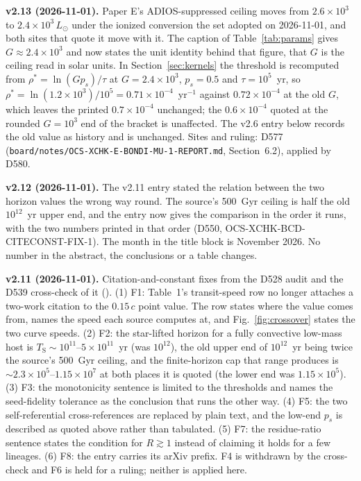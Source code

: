 \documentclass[11pt]{article}
\begin{document}
\textbf{v2.13 (2026-11-01).} Paper E's ADIOS-suppressed ceiling moves from $2.6\times10^{3}$ to $2.4\times10^{3}\,L_\odot$ under the ionized conversion the set adopted on 2026-11-01, and both sites that quote it move with it. The caption of Table~\ref{tab:params} gives $G \approx 2.4\times10^{3}$ and now states the unit identity behind that figure, that $G$ is the ceiling read in solar units. In Section~\ref{sec:kernels} the threshold is recomputed from $\rho^{*} = \ln(G p_{s})/\tau$ at $G = 2.4\times10^{3}$, $p_{s} = 0.5$ and $\tau = 10^{5}$~yr, so $\rho^{*} = \ln(1.2\times10^{3})/10^{5} = 0.71\times10^{-4}$~yr$^{-1}$ against $0.72\times10^{-4}$ at the old $G$, which leaves the printed $0.7\times10^{-4}$ unchanged; the $0.6\times10^{-4}$ quoted at the rounded $G = 10^{3}$ end of the bracket is unaffected. The v2.6 entry below records the old value as history and is unchanged. Sites and ruling: D577 (\texttt{board/notes/OCS-XCHK-E-BONDI-MU-1-REPORT.md}, Section~6.2), applied by D580.

\textbf{v2.12 (2026-11-01).} The v2.11 entry stated the relation between the two horizon values the wrong way round. The source's 500~Gyr ceiling is half the old $10^{12}$~yr upper end, and the entry now gives the comparison in the order it runs, with the two numbers printed in that order (D550, OCS-XCHK-BCD-CITECONST-FIX-1). The month in the title block is November 2026. No number in the abstract, the conclusions or a table changes.

\textbf{v2.11 (2026-11-01).} Citation-and-constant fixes from the D528 audit and the D539 cross-check of it (). (1) F1: Table~1's transit-speed row no longer attaches a two-work citation to the $0.15\,c$ point value. The row states where the value comes from, names the speed each source computes at, and Fig.~\ref{fig:crossover} states the two curve speeds. (2) F2: the star-lifted horizon for a fully convective low-mass host is $T_{\mathrm S} \sim 10^{11}$--$5\times10^{11}$~yr (was $10^{12}$), the old upper end of $10^{12}$~yr being twice the source's 500~Gyr ceiling, and the finite-horizon cap that range produces is $\sim2.3\times10^{5}$--$1.15\times10^{7}$ at both places it is quoted (the lower end was $1.15\times10^{5}$). (3) F3: the monotonicity sentence is limited to the thresholds and names the seed-fidelity tolerance as the conclusion that runs the other way. (4) F5: the two self-referential cross-references are replaced by plain text, and the low-end $p_{s}$ is described as quoted above rather than tabulated. (5) F7: the residue-ratio sentence states the condition for $R \gtrsim 1$ instead of claiming it holds for a few lineages. (6) F8: the \citet{ScogginsKipping2023} entry carries its arXiv prefix. F4 is withdrawn by the cross-check and F6 is held for a ruling; neither is applied here.
\end{document}

